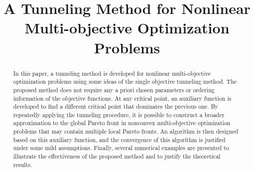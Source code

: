 \documentclass[amsa]{ipart}
\theoremstyle{plain}
\numberwithin{equation}{section}
\begin{document}
\begin{frontmatter}
\title[A Tunneling Method for Nonlinear MOP]{A Tunneling Method for Nonlinear Multi-objective Optimization Problems}
%

\begin{abstract}
In this paper, a tunneling method is developed for nonlinear multi-objective optimization problems using some ideas of the single objective tunneling method. The proposed method does not require any a priori chosen parameters or ordering information of the objective functions. At any critical point, an auxiliary function is developed to find a different critical point that dominates the previous one. By repeatedly applying the tunneling procedure, it is possible to construct a broader approximation to the global Pareto front in nonconvex multi-objective optimization problems that may contain multiple local Pareto fronts. An algorithm is then designed based on this auxiliary function, and the convergence of this algorithm is justified under some mild assumptions. Finally, several numerical examples are presented to illustrate the effectiveness of the proposed method and to justify the theoretical results.
\end{abstract}

\begin{keyword}[class=AMS]
\end{keyword}

\begin{keyword}
   
\end{keyword}

\end{frontmatter}
\end{document}

